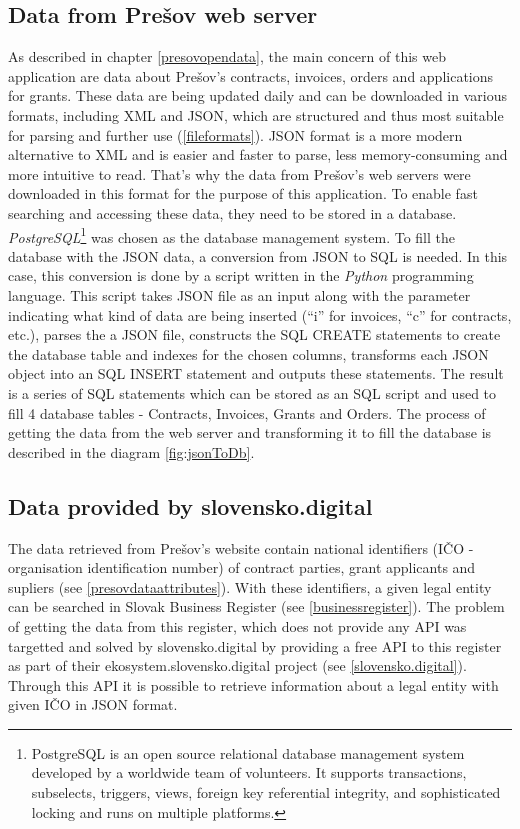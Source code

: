 \documentclass[thesis=B,english]{FITthesis}[2012/06/26]
\begin{document}
	\subsection{Data from Prešov web server}
	As described in chapter \ref{presovopendata}, the main concern of this web application are data about Prešov's contracts, invoices, orders and applications for grants. These data are being updated daily and can be downloaded in various formats, including XML and JSON, which are structured and thus most suitable for parsing and further use (\ref{fileformats}). JSON format is a more modern alternative to XML and is easier and faster to parse, less memory-consuming and more intuitive to read. That's why the data from Prešov's web servers were downloaded in this format for the purpose of this application. To enable fast searching and accessing these data, they need to be stored in a database. \textit{PostgreSQL}\footnote{PostgreSQL is an open source relational database management system developed by a worldwide team of volunteers. It supports transactions, subselects, triggers, views, foreign key referential integrity, and sophisticated locking and runs on multiple platforms.} was chosen as the database management system. To fill the database with the JSON data, a conversion from JSON to SQL is needed. In this case, this conversion is done by a script written in the \textit{Python} programming language. This script takes JSON file as an input along with the parameter indicating what kind of data are being inserted (``i'' for invoices, ``c'' for contracts, etc.), parses the a JSON file, constructs the SQL CREATE statements to create the database table and indexes for the chosen columns, transforms each JSON object into an SQL INSERT statement and outputs these statements. The result is a series of SQL statements which can be stored as an SQL script and used to fill 4 database tables - Contracts, Invoices, Grants and Orders. The process of getting the data from the web server and transforming it to fill the database is described in the diagram \ref{fig:jsonToDb}.

	\subsection{Data provided by slovensko.digital}
	\label{data-slovensko-digital}
	The data retrieved from Prešov's website contain national identifiers (IČO - organisation identification number) of contract parties, grant applicants and supliers (see \ref{presovdataattributes}). With these identifiers, a given legal entity can be searched in Slovak Business Register (see \ref{businessregister}). The problem of getting the data from this register, which does not provide any API was targetted and solved by slovensko.digital by providing a free API to this register as part of their ekosystem.slovensko.digital project (see \ref{slovensko.digital}). Through this API it is possible to retrieve information about a legal entity with given IČO in JSON format. 
	
\end{document}
